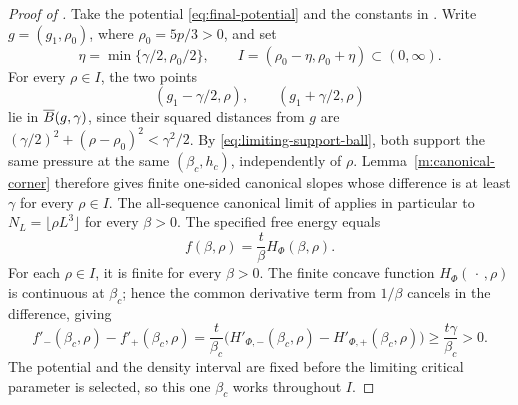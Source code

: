\begin{proof}[Proof of ]
Take the potential \eqref{eq:final-potential} and the constants in
.
Write \(g=(g_1,\rho_0)\), where \(\rho_0=5p/3>0\), and set
\[
 \eta=\min\{\gamma/2,\rho_0/2\},\qquad
 I=(\rho_0-\eta,\rho_0+\eta)\subset(0,\infty).
\]
For every \(\rho\in I\), the two points
\[
 (g_1-\gamma/2,\rho),\qquad(g_1+\gamma/2,\rho)
\]
lie in \(\overline B(g,\gamma)\), since their squared distances from \(g\)
are \((\gamma/2)^2+(\rho-\rho_0)^2<\gamma^2/2\).
By \eqref{eq:limiting-support-ball}, both support the same pressure at
the same \((\beta_c,h_c)\), independently of \(\rho\).
Lemma~\ref{m:canonical-corner} therefore gives finite one-sided
canonical slopes whose difference is at least \(\gamma\) for every
\(\rho\in I\).
The all-sequence canonical limit of  applies
in particular to \(N_L=\lfloor\rho L^3\rfloor\) for every \(\beta>0\).
The specified free energy equals
\[
 f(\beta,\rho)=\frac{t}{\beta}H_\Phi(\beta,\rho).
\]
For each \(\rho\in I\), it is finite for every \(\beta>0\).
The finite concave function \(H_\Phi(\,\cdot\,,\rho)\) is continuous
at \(\beta_c\); hence the common derivative term from \(1/\beta\)
cancels in the difference, giving
\[
 f'_-(\beta_c,\rho)-f'_+(\beta_c,\rho)
 =\frac{t}{\beta_c}
       \bigl(H'_{\Phi,-}(\beta_c,\rho)
                    -H'_{\Phi,+}(\beta_c,\rho)\bigr)
 \ge\frac{t\gamma}{\beta_c}>0.
\]
The potential and the density interval are fixed before the limiting
critical parameter is selected, so this one \(\beta_c\) works throughout
\(I\).
\end{proof}

